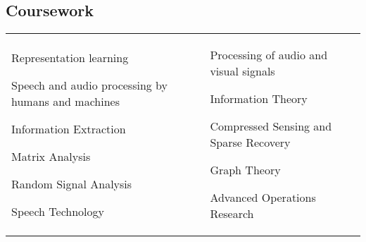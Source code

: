 \documentclass[margin,line,pifont,palatino,courier]{res}
\newenvironment{list1}{
  \begin{list}{\ding{113}}{%
      \setlength{\itemsep}{0in}
      \setlength{\parsep}{0in} \setlength{\parskip}{0in}
      \setlength{\topsep}{0in} \setlength{\partopsep}{0in}
      \setlength{\leftmargin}{0.17in}}}{\end{list}}
\begin{document}
\begin{resume}
%


\section{\sc Coursework}

\begin{tabular}{@{}p{2.3in}p{3in}}
\begin{list1}
\item Representation learning
\item Speech and audio processing by humans and machines
\item Information Extraction
\item Matrix Analysis
\item Random Signal Analysis
\item Speech Technology

\end{list1}
&
\begin{list1}
\item Processing of audio and visual signals
\item Information Theory
\item Compressed Sensing and Sparse Recovery
\item Graph Theory
\item Advanced Operations Research
\end{list1}

\end{tabular}


\end{resume}
\end{document}
